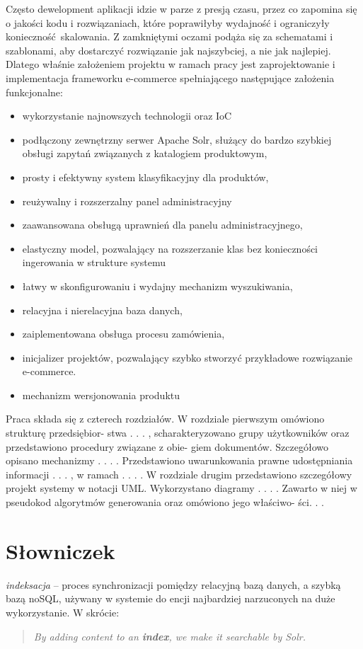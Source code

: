 Często dewelopment aplikacji idzie w parze z presją czasu, przez co zapomina  się o jakości kodu i rozwiązaniach, które poprawiłyby wydajność i ograniczyły konieczność skalowania. Z zamkniętymi oczami podąża się za schematami i szablonami, aby dostarczyć rozwiązanie jak najszybciej, a nie jak najlepiej. Dlatego właśnie założeniem projektu w ramach pracy jest zaprojektowanie i implementacja frameworku e-commerce spełniającego następujące założenia funkcjonalne:
\begin{itemize}
  	\item wykorzystanie najnowszych technologii oraz IoC
	\item podłączony zewnętrzny serwer Apache Solr, służący do bardzo szybkiej obsługi zapytań związanych z katalogiem produktowym,
	\item prosty i efektywny system klasyfikacyjny dla produktów,
	\item reużywalny i rozszerzalny panel administracyjny 
	\item zaawansowana obsługą uprawnień dla panelu administracyjnego,
	\item elastyczny model, pozwalający na rozszerzanie klas bez konieczności ingerowania w strukture systemu
	\item łatwy w skonfigurowaniu i wydajny mechanizm wyszukiwania,
	\item relacyjna i nierelacyjna baza danych,
	\item zaiplementowana obsługa procesu zamówienia,
	\item inicjalizer projektów, pozwalający szybko stworzyć przykładowe rozwiązanie e-commerce.
	\item mechanizm wersjonowania produktu
\end{itemize}

Praca składa się z czterech rozdziałów. W rozdziale pierwszym omówiono strukturę przedsiębior-
stwa . . . , scharakteryzowano grupy użytkowników oraz przedstawiono procedury związane z obie-
giem dokumentów. Szczegółowo opisano mechanizmy . . . . Przedstawiono uwarunkowania prawne
udostępniania informacji . . . , w ramach . . . .
W rozdziale drugim przedstawiono szczegółowy projekt systemy w notacji UML. Wykorzystano
diagramy . . . . Zawarto w niej w pseudokod algorytmów generowania oraz omówiono jego właściwo-
ści. . . 

\section{Słowniczek}
\noindent
\textit{indeksacja} -- proces synchronizacji pomiędzy relacyjną bazą danych, a szybką bazą noSQL, używany w systemie do encji najbardziej narzuconych na duże wykorzystanie. W skrócie: 
\begin{quote}
	\textit{By adding content to an \textbf{index}, we make it searchable by Solr.}\cite{Solr} 
\end{quote}


